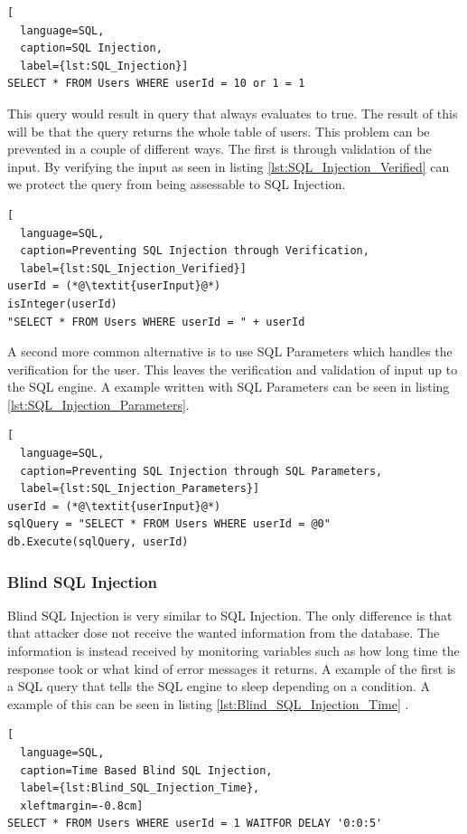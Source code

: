 \hfill
\begin{lstlisting}[
  language=SQL,
  caption=SQL Injection,
  label={lst:SQL_Injection}]
SELECT * FROM Users WHERE userId = 10 or 1 = 1
\end{lstlisting}
\hfill

This query would result in query that always evaluates to true. The result of this will be that the query returns the whole table of users. This problem can be prevented in a couple of different ways. The first is through validation of the input. By verifying the input as seen in listing \ref{lst:SQL_Injection_Verified} can we protect the query from being assessable to SQL Injection.

\hfill
\begin{lstlisting}[
  language=SQL,
  caption=Preventing SQL Injection through Verification,
  label={lst:SQL_Injection_Verified}]
userId = (*@\textit{userInput}@*)
isInteger(userId)
"SELECT * FROM Users WHERE userId = " + userId
\end{lstlisting}
\hfill

A second more common alternative is to use SQL Parameters which handles the verification for the user. This leaves the verification and validation of input up to the SQL engine. A example written with SQL Parameters can be seen in listing \ref{lst:SQL_Injection_Parameters}.

\hfill
\begin{lstlisting}[
  language=SQL,
  caption=Preventing SQL Injection through SQL Parameters,
  label={lst:SQL_Injection_Parameters}]
userId = (*@\textit{userInput}@*)
sqlQuery = "SELECT * FROM Users WHERE userId = @0"
db.Execute(sqlQuery, userId)
\end{lstlisting}


\subsubsection{Blind SQL Injection}
Blind SQL Injection is very similar to SQL Injection. The only difference is that that attacker dose not receive the wanted information from the database. The information is instead received by monitoring variables such as how long time the response took or what kind of error messages it returns. A example of the first is a SQL query that tells the SQL engine to sleep depending on a condition. A example of this can be seen in listing \ref{lst:Blind_SQL_Injection_Time} \parencite{JustinClarke-Salt2009SIAa, Secure_Web}.

\hfill
\begin{lstlisting}[
  language=SQL,
  caption=Time Based Blind SQL Injection,
  label={lst:Blind_SQL_Injection_Time},
  xleftmargin=-0.8cm]
SELECT * FROM Users WHERE userId = 1 WAITFOR DELAY '0:0:5'
\end{lstlisting}
\hfill

